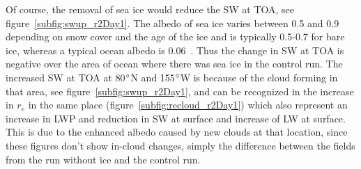 
Of course, the removal of sea ice would reduce the SW at TOA, see figure~\ref{subfig:swup_r2Day1}. The albedo of sea ice varies between 0.5 and 0.9 depending on snow cover and the age of the ice and is typically 0.5-0.7 for bare ice, whereas a typical ocean albedo is 0.06~\citep{NSIDC}. Thus the change in SW at TOA is negative over the area of ocean where there was sea ice in the control run. The increased SW at TOA at 80$\degree$N and 155$\degree$W is because of the cloud forming in that area, see figure~\ref{subfig:swup_r2Day1}, and can be recognized in the increase in $r_e$ in the same place (figure~\ref{subfig:recloud_r2Day1}) which also represent an increase in LWP and reduction in SW at surface and increase of LW at surface. This is due to the enhanced albedo caused by new clouds at that location, since these figures don't show in-cloud changes, simply the difference between the fields from the run without ice and the control run.

